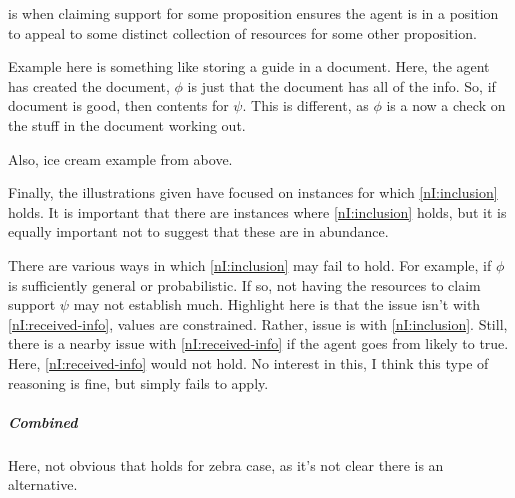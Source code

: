 \begin{note}[\asso{}]
  \asso{} is when claiming support for some proposition ensures the agent is in a position to appeal to some distinct collection of resources for some other proposition.

  \begin{illustration}
    Example here is something like storing a guide in a document.
    Here, the agent has created the document, \(\phi\) is just that the document has all of the info.
    So, if document is good, then contents for \(\psi\).
    This is different, as \(\phi\) is a now a check on the stuff in the document working out.
  \end{illustration}

  Also, ice cream example from above.
\end{note}

\begin{note}
  Finally, the illustrations given have focused on instances for which \ref{nI:inclusion} holds.
  It is important that there are instances where \ref{nI:inclusion} holds, but it is equally important not to suggest that these are in abundance.
\end{note}

\begin{note}
  There are various ways in which \ref{nI:inclusion} may fail to hold.
  For example, if \(\phi\) is sufficiently general or probabilistic.
  If so, not having the resources to claim support \(\psi\) may not establish much.
  Highlight here is that the issue isn't with \ref{nI:received-info}, values are constrained.
  Rather, issue is with \ref{nI:inclusion}.
  Still, there is a nearby issue with \ref{nI:received-info} if the agent goes from likely to true.
  Here, \ref{nI:received-info} would not hold.
  No interest in this, I think this type of reasoning is fine, but \nI{} simply fails to apply.
\end{note}

\subparagraph{Combined}

\begin{note}
  Here, not obvious that holds for zebra case, as it's not clear there is an alternative.
\end{note}

